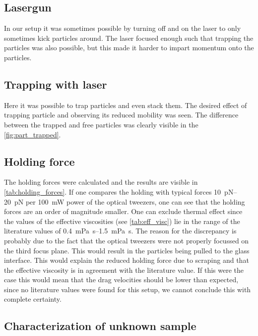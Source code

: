 \documentclass[12pt,english]{scrartcl}
\begin{document}
\subsection{Lasergun}

In our setup it was sometimes possible by turning off and on the laser to only
sometimes kick particles around. The laser focused enough such that trapping
the particles was also possible, but this made it harder to impart momentum
onto the particles.

\subsection{Trapping with laser}

Here it was possible to trap particles and even stack them. The desired effect
of trapping particle and observing its reduced mobility was seen. The
difference between the trapped and free particles was clearly visible in the
\autoref{fig:part_trapped}.

\subsection{Holding force}

The holding forces were calculated and the results are visible in
\autoref{tab:holding_forces}. If one compares the holding with typical forces
\SIrange{10}{20}{\pico\newton} per \SI{100}{\milli\watt} power of the optical
tweezers, one can see that the holding forces are an order of magnitude
smaller. One can exclude thermal effect since the values of the effective
viscosities (see \autoref{tab:eff_visc}) lie in the range of the literature
values of
\SIrange{0.4}{1.5}{\milli\pascal\second}\~\cite{ViscosityWaterViscosity}. The
reason for the discrepancy is probably due to the fact that the optical
tweezers were not properly focussed on the third focus plane. This would result
in the particles being pulled to the glass interface. This would explain the
reduced holding force due to scraping and that the effective viscosity is in
agreement with the literature value. If this were the case this would mean that
the drag velocities should be lower than expected, since no literature values
were found for this setup, we cannot conclude this with complete certainty.

\subsection{Characterization of unknown sample}
\end{document}

